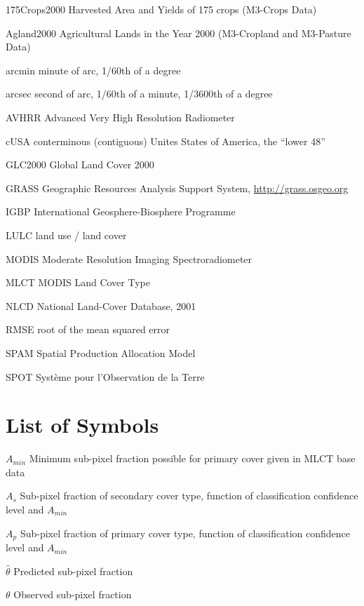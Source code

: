 \documentclass[draftthesis]{neiuthesis}
\begin{document}
\begin{symbollist*}
\item[175Crops2000] Harvested Area and Yields of 175 crops (M3-Crops
  Data) \citep{Monfreda2008}
\item[Agland2000] Agricultural Lands in the Year 2000 (M3-Cropland and
  M3-Pasture Data) \citep{Ramankutty2008}
\item[arcmin] minute of arc, 1/60th of a degree
\item[arcsec] second of arc, 1/60th of a minute, 1/3600th of a degree
\item[AVHRR] Advanced Very High Resolution Radiometer
\item[cUSA] conterminous (contiguous) Unites States of America, the ``lower 48''
\item[GLC2000] Global Land Cover 2000 \citep{EC2003}
\item[GRASS] Geographic Resources Analysis Support System, \url{http://grass.osgeo.org}
\item[IGBP] International Geosphere-Biosphere Programme
\item[LULC] land use / land cover
\item[MODIS] Moderate Resolution Imaging Spectroradiometer
\item[MLCT] MODIS Land Cover Type \citep{MLCT}
\item[NLCD] National Land-Cover Database, 2001 \citep{Homer2004}
\item[RMSE] root of the mean squared error
\item[SPAM] Spatial Production Allocation Model
\item[SPOT] Syst\`eme pour l'Observation de la Terre

\end{symbollist*}

\chapter{List of Symbols}

\begin{symbollist}[0.7in]
\item[$A_{min}$] Minimum sub-pixel fraction possible for primary cover
  given in MLCT base data
\item[$A_s$] Sub-pixel fraction of secondary cover type, function of
  classification confidence level and $A_{min}$
\item[$A_p$] Sub-pixel fraction of primary cover type, function of
  classification confidence level and $A_{min}$
\item[$\hat\theta$] Predicted sub-pixel fraction
\item[$\theta$] Observed sub-pixel fraction
\end{symbollist}
\end{document}
